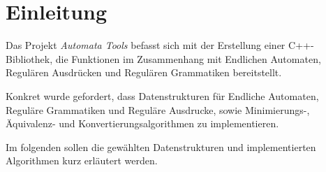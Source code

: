 \chapter{Einleitung}

Das Projekt \textit{Automata Tools} befasst sich mit der Erstellung einer C++-Bibliothek, die Funktionen im Zusammenhang mit Endlichen Automaten, Regulären Ausdrücken und Regulären Grammatiken bereitstellt.

Konkret wurde gefordert, dass Datenstrukturen für Endliche Automaten, Reguläre Grammatiken und Reguläre Ausdrucke, sowie Minimierungs-, Äquivalenz- und Konvertierungsalgorithmen zu implementieren.

Im folgenden sollen die gewählten Datenstrukturen und implementierten Algorithmen kurz erläutert werden.